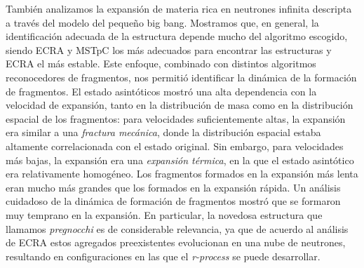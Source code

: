 También analizamos la expansión de materia rica en neutrones infinita descripta a través del modelo del pequeño big bang.
Mostramos que, en general, la identificación adecuada de la estructura depende mucho del algoritmo escogido, siendo ECRA y MSTpC los más adecuados para encontrar las estructuras y ECRA el más estable.
Este enfoque, combinado con distintos algoritmos reconocedores de fragmentos, nos permitió identificar la dinámica de la formación de fragmentos.
El estado asintóticos mostró una alta dependencia con la velocidad de expansión, tanto en la distribución de masa como en la distribución espacial de los fragmentos: para velocidades suficientemente altas, la expansión era similar a una \emph{fractura mecánica}, donde la distribución espacial estaba altamente correlacionada con el estado original.
Sin embargo, para velocidades más bajas, la expansión era una \emph{expansión térmica}, en la que el estado asintótico era relativamente homogéneo.
Los fragmentos formados en la expansión más lenta eran mucho más grandes que los formados en la expansión rápida.
Un análisis cuidadoso de la dinámica de formación de fragmentos mostró que se formaron muy temprano en la expansión.
En particular, la novedosa estructura que llamamos \emph{pregnocchi} es de considerable relevancia, ya que de acuerdo al análisis de ECRA estos agregados preexistentes evolucionan en una nube de neutrones, resultando en configuraciones en las que el \emph{r-process} se puede desarrollar.
